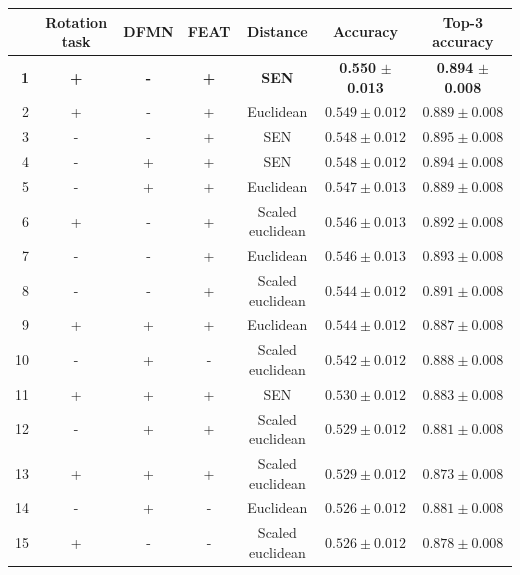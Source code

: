 \documentclass[a4paper, 12pt]{report}
\begin{document}
\begin{table}[h!]
\begin{adjustbox}{center}
\begin{tabular}{| r | c c c c | c |  c | }
\hline
    & Rotation task   & DFMN   & FEAT   & Distance         & Accuracy         & Top-3 accuracy   \\
\hline
  \textbf{1} & \textbf{+} & \textbf{-} & \textbf{+} & \textbf{SEN} & \textbf{0.550} $\pm$ \textbf{0.013} & \textbf{0.894} $\pm$ \textbf{0.008} \\
\hline
  2 & +               & -      & +      & Euclidean        & $0.549 \pm 0.012$ & $0.889 \pm 0.008$ \\
\hline
  3 & -               & -      & +      & SEN              & $0.548 \pm 0.012$ & $0.895 \pm 0.008$ \\
\hline
  4 & -               & +      & +      & SEN              & $0.548 \pm 0.012$ & $0.894 \pm 0.008$ \\
\hline
  5 & -               & +      & +      & Euclidean        & $0.547 \pm 0.013$ & $0.889 \pm 0.008$ \\
\hline
  6 & +               & -      & +      & Scaled euclidean & $0.546 \pm 0.013$ & $0.892 \pm 0.008$ \\
\hline
  7 & -               & -      & +      & Euclidean        & $0.546 \pm 0.013$ & $0.893 \pm 0.008$ \\
\hline
  8 & -               & -      & +      & Scaled euclidean & $0.544 \pm 0.012$ & $0.891 \pm 0.008$ \\
\hline
  9 & +               & +      & +      & Euclidean        & $0.544 \pm 0.012$ & $0.887 \pm 0.008$ \\
\hline
 10 & -               & +      & -      & Scaled euclidean & $0.542 \pm 0.012$ & $0.888 \pm 0.008$ \\
\hline
 11 & +               & +      & +      & SEN              & $0.530 \pm 0.012$ & $0.883 \pm 0.008$ \\
\hline
 12 & -               & +      & +      & Scaled euclidean & $0.529 \pm 0.012$ & $0.881 \pm 0.008$ \\
\hline
 13 & +               & +      & +      & Scaled euclidean & $0.529 \pm 0.012$ & $0.873 \pm 0.008$ \\
\hline
 14 & -               & +      & -      & Euclidean        & $0.526 \pm 0.012$ & $0.881 \pm 0.008$ \\
\hline
 15 & +               & -      & -      & Scaled euclidean & $0.526 \pm 0.012$ & $0.878 \pm 0.008$ \\

\end{tabular}
\end{adjustbox}
\end{table}
\end{document}
